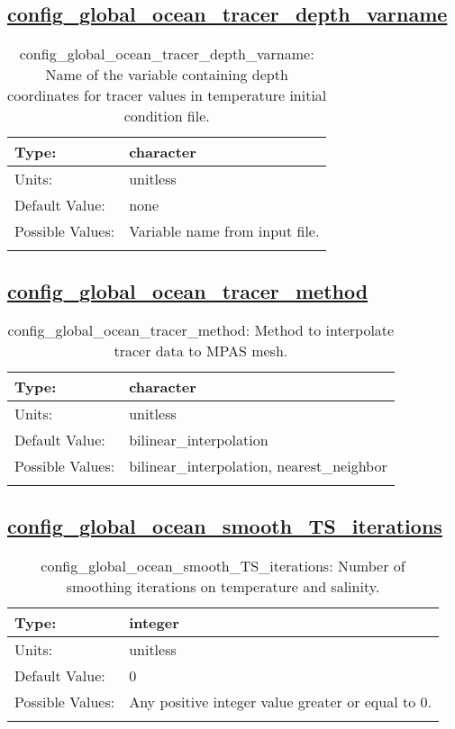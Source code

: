 \subsection[config\_global\_ocean\_tracer\_depth\_varname]{\hyperref[sec:nm_tab_global_ocean]{config\_global\_ocean\_tracer\_depth\_varname}}
\label{subsec:nm_sec_config_global_ocean_tracer_depth_varname}
\begin{center}
\begin{longtable}{| p{2.0in} || p{4.0in} |}
    \hline
    Type: & character \\
    \hline
    Units: & \si{unitless} \\
    \hline
    Default Value: & none \\
    \hline
    Possible Values: & Variable name from input file. \\
    \hline
    \caption{config\_global\_ocean\_tracer\_depth\_varname: Name of the variable containing depth coordinates for tracer values in temperature initial condition file.}
\end{longtable}
\end{center}
\subsection[config\_global\_ocean\_tracer\_method]{\hyperref[sec:nm_tab_global_ocean]{config\_global\_ocean\_tracer\_method}}
\label{subsec:nm_sec_config_global_ocean_tracer_method}
\begin{center}
\begin{longtable}{| p{2.0in} || p{4.0in} |}
    \hline
    Type: & character \\
    \hline
    Units: & \si{unitless} \\
    \hline
    Default Value: & bilinear\_interpolation \\
    \hline
    Possible Values: & bilinear\_interpolation, nearest\_neighbor \\
    \hline
    \caption{config\_global\_ocean\_tracer\_method: Method to interpolate tracer data to MPAS mesh.}
\end{longtable}
\end{center}
\subsection[config\_global\_ocean\_smooth\_TS\_iterations]{\hyperref[sec:nm_tab_global_ocean]{config\_global\_ocean\_smooth\_TS\_iterations}}
\label{subsec:nm_sec_config_global_ocean_smooth_TS_iterations}
\begin{center}
\begin{longtable}{| p{2.0in} || p{4.0in} |}
    \hline
    Type: & integer \\
    \hline
    Units: & \si{unitless} \\
    \hline
    Default Value: & 0 \\
    \hline
    Possible Values: & Any positive integer value greater or equal to 0. \\
    \hline
    \caption{config\_global\_ocean\_smooth\_TS\_iterations: Number of smoothing iterations on temperature and salinity.}
\end{longtable}
\end{center}
